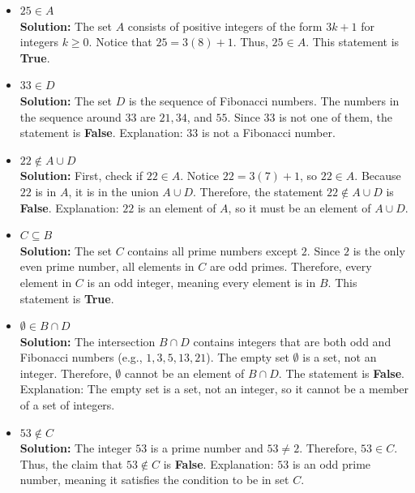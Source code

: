 \documentclass[11pt]{article}
\begin{document}
\begin{itemize}
    \item[(a)] $25 \in A$ \\
    \textbf{Solution:} The set $A$ consists of positive integers of the form $3k + 1$ for integers $k \ge 0$. Notice that $25 = 3(8) + 1$. Thus, $25 \in A$. This statement is \textbf{True}.
    
    \item[(b)] $33 \in D$ \\
    \textbf{Solution:} The set $D$ is the sequence of Fibonacci numbers. The numbers in the sequence around $33$ are $21, 34$, and $55$. Since $33$ is not one of them, the statement is \textbf{False}. Explanation: $33$ is not a Fibonacci number.
    
    \item[(c)] $22 \notin A \cup D$ \\
    \textbf{Solution:} First, check if $22 \in A$. Notice $22 = 3(7) + 1$, so $22 \in A$. Because $22$ is in $A$, it is in the union $A \cup D$. Therefore, the statement $22 \notin A \cup D$ is \textbf{False}. Explanation: $22$ is an element of $A$, so it must be an element of $A \cup D$.
    
    \item[(d)] $C \subseteq B$ \\
    \textbf{Solution:} The set $C$ contains all prime numbers except $2$. Since $2$ is the only even prime number, all elements in $C$ are odd primes. Therefore, every element in $C$ is an odd integer, meaning every element is in $B$. This statement is \textbf{True}.
    
    \item[(e)] $\emptyset \in B \cap D$ \\
    \textbf{Solution:} The intersection $B \cap D$ contains integers that are both odd and Fibonacci numbers (e.g., $1, 3, 5, 13, 21$). The empty set $\emptyset$ is a set, not an integer. Therefore, $\emptyset$ cannot be an element of $B \cap D$. The statement is \textbf{False}. Explanation: The empty set is a set, not an integer, so it cannot be a member of a set of integers.
    
    \item[(f)] $53 \notin C$ \\
    \textbf{Solution:} The integer $53$ is a prime number and $53 \neq 2$. Therefore, $53 \in C$. Thus, the claim that $53 \notin C$ is \textbf{False}. Explanation: $53$ is an odd prime number, meaning it satisfies the condition to be in set $C$.
\end{itemize}
\end{document}
